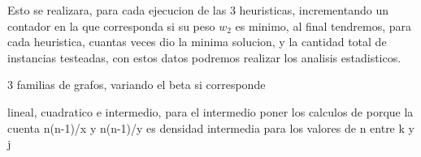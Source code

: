 Esto se realizara, para cada ejecucion de las 3 heuristicas, incrementando un contador en la que corresponda si su peso $w_2$ es minimo, al final tendremos, para cada heuristica, cuantas veces dio la minima solucion, y la cantidad total de instancias testeadas, con estos datos podremos realizar los analisis estadisticos.



3 familias de grafos, variando el beta si corresponde

lineal, cuadratico e intermedio, para el intermedio poner 
los calculos de porque la cuenta n(n-1)/x y n(n-1)/y es densidad intermedia para los valores de n entre k y j